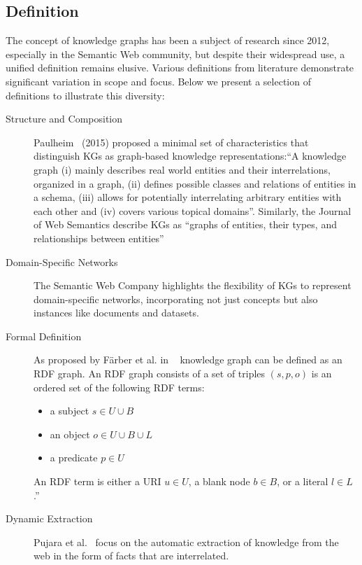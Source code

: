 \subsection{Definition}\label{kgs:definition}
The concept of knowledge graphs has been a subject of research since 2012, especially in the Semantic Web community, but despite their widespread use, a unified definition remains elusive. Various definitions from literature demonstrate significant variation in scope and focus. Below we present a selection of definitions to illustrate this diversity:
\begin{description}
    \item[Structure and Composition] Paulheim~\cite{Paulheim2016KnowledgeGR} (2015) proposed a minimal set of characteristics that distinguish KGs as graph-based knowledge representations:``A knowledge graph (i) mainly describes real world entities and their interrelations, organized in a graph, (ii) defines possible classes and relations of entities in a schema, (iii) allows for potentially interrelating arbitrary entities with each other and (iv) covers various topical domains''. Similarly, the Journal of Web Semantics describe KGs as ``graphs of entities, their types, and relationships between entities''~\cite{Kroetsch2016knowledge}
    \item[Domain-Specific Networks] The Semantic Web Company highlights the flexibility of KGs to represent domain-specific networks, incorporating not just concepts but also instances like documents and datasets.~\cite{Blumauer2014knowledge}
    \item[Formal Definition] As proposed by Färber et al. in ~\cite{Farber2016linked} knowledge graph can be defined as an RDF graph. An RDF graph consists of a set of triples $(s, p, o)$ is an ordered set of the following RDF terms: 
    \begin{itemize}
        \item a subject $s\in U \cup B$
        \item an object $o\in U\cup B\cup L$
        \item a predicate $p\in U$
    \end{itemize}
    An RDF term is either a URI $u\in U$, a blank node $b\in B$, or a literal $l\in L$.”
    \item[Dynamic Extraction] Pujara et al.~\cite{Pujara2013KnowledgeGF} focus on the automatic extraction of knowledge from the web in the form of facts that are interrelated.
\end{description}


